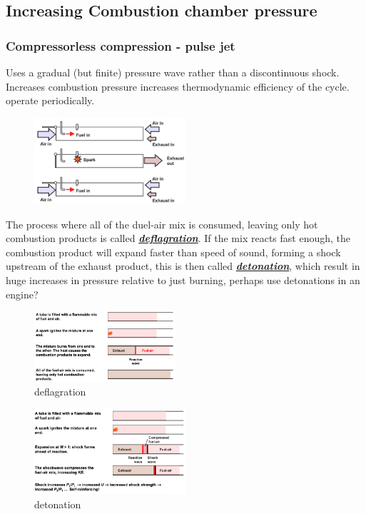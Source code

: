 \documentclass[a4paper,10pt]{article}
\begin{document}
\subsection{Increasing Combustion chamber pressure}

\subsubsection{Compressorless compression - pulse jet}
Uses a gradual (but finite) pressure wave rather than a discontinuous shock. Increases combustion pressure increases thermodynamic efficiency of the cycle. operate periodically. 
\begin{figure}[H]
    \centering
    \includegraphics[width=0.5\textwidth]{Figure/pulse.png}
\end{figure}

\vspace*{-0.5cm}
The process where all of the duel-air mix is consumed, leaving only hot combustion products is called \underline{\textbf{\textit{deflagration}}}. If the mix reacts fast enough, the combustion product will expand faster than speed of sound, forming a shock upstream of the exhaust product, this is then called \underline{\textit{\textbf{detonation}}}, which  result in huge increases in pressure relative to just burning, perhaps use detonations in an engine?
\vspace*{0.5cm}
\begin{multicols}{2}
    \begin{figure}[H]
        \centering
        \includegraphics[width=0.47\textwidth]{Figure/deflagration.png}
        \caption[short]{deflagration}
    \end{figure}

    \begin{figure}[H]
        \centering
        \includegraphics[width=0.5\textwidth]{Figure/detonation.png}
        \caption[short]{detonation}
    \end{figure}
\end{multicols}
\end{document}
